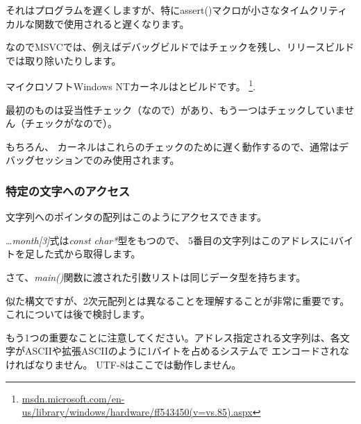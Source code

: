 それはプログラムを遅くしますが、特にassert()マクロが小さなタイムクリティカルな関数で使用されると遅くなります。

なのでMSVCでは、例えばデバッグビルドではチェックを残し、リリースビルドでは取り除いたりします。
 
マイクロソフト\gls{Windows NT}カーネルはとビルドです。
\footnote{\href{http://go.yurichev.com/17259}{msdn.microsoft.com/en-us/library/windows/hardware/ff543450(v=vs.85).aspx}}.

最初のものは妥当性チェック（なので）があり、もう一つはチェックしていません（チェックがなので）。

もちろん、 カーネルはこれらのチェックのために遅く動作するので、通常はデバッグセッションでのみ使用されます。


\subsubsection{特定の文字へのアクセス}

文字列へのポインタの配列はこのようにアクセスできます。



\dots \emph{month[3]}式は\emph{const char*}型をもつので、
5番目の文字列はこのアドレスに4バイトを足した式から取得します。

さて、\emph{main()}関数に渡された引数リストは同じデータ型を持ちます。



似た構文ですが、2次元配列とは異なることを理解することが非常に重要です。
これについては後で検討します。

もう1つの重要なことに注意してください。アドレス指定される文字列は、各文字が\ac{ASCII}や拡張\ac{ASCII}のように1バイトを占めるシステムで
エンコードされなければなりません。 
UTF-8はここでは動作しません。
